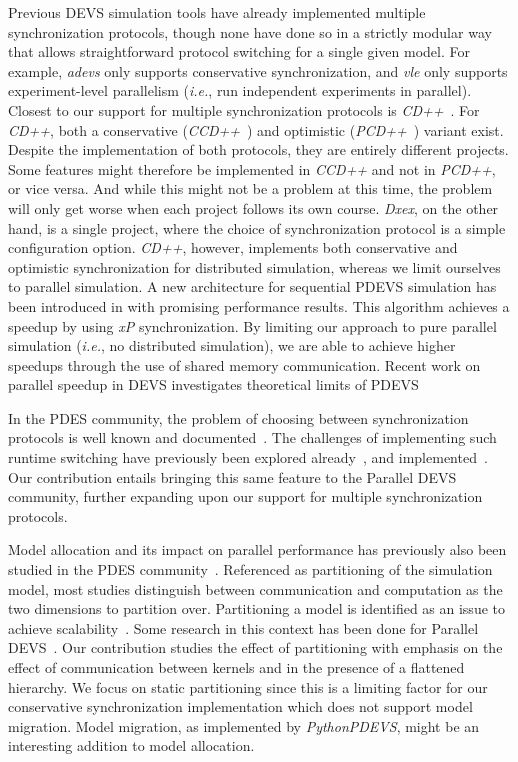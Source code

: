 Previous \textsf{DEVS} simulation tools have already implemented multiple synchronization protocols, though none have done so in a strictly modular way that allows straightforward protocol switching for a single given model.
For example, \textit{adevs} only supports conservative synchronization, and \textit{vle} only supports experiment-level parallelism (\textit{i.e.}, run independent experiments in parallel).
Closest to our support for multiple synchronization protocols is \textit{CD++}~\cite{CD++}.
For \textit{CD++}, both a conservative (\textit{CCD++}~\cite{CCD++}) and optimistic (\textit{PCD++}~\cite{PCD++}) variant exist.
Despite the implementation of both protocols, they are entirely different projects.
Some features might therefore be implemented in \textit{CCD++} and not in \textit{PCD++}, or vice versa.
And while this might not be a problem at this time, the problem will only get worse when each project follows its own course.
\textit{Dxex}, on the other hand, is a single project, where the choice of synchronization protocol is a simple configuration option.
\textit{CD++}, however, implements both conservative and optimistic synchronization for distributed simulation, whereas we limit ourselves to parallel simulation. 
A new architecture for sequential PDEVS simulation has been introduced in \cite{SeqPDEVSArch} with promising performance results.
This algorithm achieves a speedup by using \textit{xP} synchronization.
By limiting our approach to pure parallel simulation (\textit{i.e.}, no distributed simulation), we are able to achieve higher speedups through the use of shared memory communication. 
Recent work on parallel speedup in DEVS investigates theoretical limits of PDEVS~\cite{activitypdevs, amdahlpdevs}

In the \textsf{PDES} community, the problem of choosing between synchronization protocols is well known and documented~\cite{Jha:1994:UFC:195291.182480}.
The challenges of implementing such runtime switching have previously been explored already~\cite{Das:1996:APP:256562.256602}, and implemented~\cite{perumalla2005musik}.
Our contribution entails bringing this same feature to the \textsf{Parallel DEVS} community, further expanding upon our support for multiple synchronization protocols.

Model allocation and its impact on parallel performance has previously also been studied in the \textsf{PDES} community~\cite{PDESpartitioning}.
Referenced as partitioning of the simulation model, most studies distinguish between communication and computation as the two dimensions to partition over.
Partitioning a model is identified as an issue to achieve scalability~\cite{Scalability}. 
Some research in this context has been done for \textsf{Parallel DEVS}~\cite{PDEVSpartitioning, NonFragmenting}.
Our contribution studies the effect of partitioning with emphasis on the effect of communication between kernels and in the presence of a flattened hierarchy. 
We focus on static partitioning since this is a limiting factor for our conservative synchronization implementation which does not support model migration.
Model migration, as implemented by \textit{PythonPDEVS}, might be an interesting addition to model allocation.

